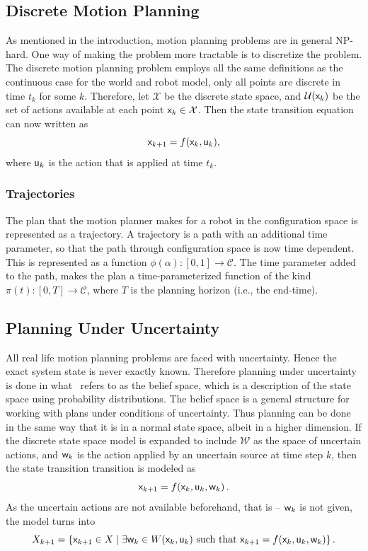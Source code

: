 \subsection{Discrete Motion Planning}

As mentioned in the introduction, motion planning problems are in general
NP-hard. One way of making the problem more tractable is to discretize the
problem. The discrete motion planning problem employs all the same definitions
as the continuous case for the world and robot model, only all points are
discrete in time \(t_k\) for some \(k\). Therefore, let \(\mathcal{X}\) be the
discrete state space, and \(\mathcal{U}({\mathbf{\mathsf{x}}}_k)\) be the set of actions
available at each point \({\mathbf{\mathsf{x}}}_k \in \mathcal{X}\). Then the state
transition equation can now written as
\[
  {\mathbf{\mathsf{x}}}_{k+1} = f({\mathbf{\mathsf{x}}}_k, {\mathbf{\mathsf{u}}}_k) ,
\]
where \({\mathbf{\mathsf{u}}}_k\) is the action that is applied at time \(t_k\).

\subsubsection{Trajectories}

The plan that the motion planner makes for a robot in the configuration space is
represented as a trajectory. A trajectory is a path with an additional time
parameter, so that the path through configuration space is now time dependent.
This is represented as a function \(\phi(\alpha) \colon [0,1] \rightarrow
\mathcal{C}\). The time parameter added to the path, makes the plan a
time-parameterized function of the kind \(\pi(t) \colon [0,T] \rightarrow
\mathcal{C}\), where \(T\) is the planning horizon (i.e., the end-time).

\subsection{Planning Under Uncertainty}

All real life motion planning problems are faced with uncertainty. Hence the
exact system state is never exactly known. Therefore planning under uncertainty
is done in what~\citeauthor{Lav06} refers to as the belief space, which is a
description of the state space using probability distributions. The belief space
is a general structure for working with plans under conditions of uncertainty.
Thus planning can be done in the same way that it is in a normal state space,
albeit in a higher dimension. If the discrete state space model is expanded to
include \(\mathcal{W}\) as the space of uncertain actions, and \({\mathbf{\mathsf{w}}}_k\) is
the action applied by an uncertain source at time step \(k\), then the state
transition transition is modeled as
\[
  {\mathbf{\mathsf{x}}}_{k+1} = f({\mathbf{\mathsf{x}}}_k,{\mathbf{\mathsf{u}}}_k,{\mathbf{\mathsf{w}}}_k) \, .
\]
As the uncertain actions are not available beforehand, that is -- \({\mathbf{\mathsf{w}}}_
k\) is not given, the model turns into
\[
  X_{k+1} = \lbrace {\mathbf{\mathsf{x}}}_{k+1} \in X \mid \exists {\mathbf{\mathsf{w}}}_k \in
    W({\mathbf{\mathsf{x}}}_k,{\mathbf{\mathsf{u}}}_k) \text{ such that } {\mathbf{\mathsf{x}}}_{k+1} =
    f({\mathbf{\mathsf{x}}}_k,{\mathbf{\mathsf{u}}}_k,{\mathbf{\mathsf{w}}}_k)\rbrace \, .
\] 

